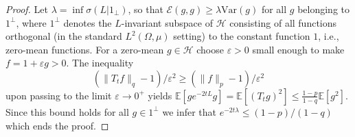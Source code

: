 \documentclass[11pt]{amsart}
\newcommand{\E}{\mathbb{E}}
\newcommand{\Var}{\mathrm{Var}}
\newcommand{\1}{\mathbf{1}}
\def\e{{\mathcal{E}}}
\def\E{{\mathbb E}}
\def\H{{\mathcal{H}}}
\theoremstyle{definition}
\theoremstyle{plain}
\theoremstyle{remark}
\numberwithin{equation}{section}
\begin{document}
\begin{proof}
Let $\lambda=\inf \sigma(L|1_{\perp})$, so that $\e(g, g) \ge \lambda \Var(g)$ for all $g$ belonging to
$1^{\perp}$,  where $1^{\perp}$ denotes the $L$-invariant subspace of $\H$ consisting of all functions
orthogonal (in the standard $L^{2}(\Omega, \mu)$ setting) to the constant function $1$, i.e.,  zero-mean functions.
For a zero-mean $g \in \H$ choose $\varepsilon>0$ small enough to make $f=1+\varepsilon g>0$. The inequality
\[
(\| T_{t}f\|_{q}-1)/\varepsilon^{2} \geq
(\| f\|_{p}-1)/\varepsilon^{2}
\]
upon passing to the limit $\varepsilon \to 0^{+}$ yields
$\E [ge^{-2tL}g]=\E[ (T_{t}g)^{2}] \leq \frac{1-p}{1-q} \E[g^{2}]$. Since this bound holds for all $g \in 1^{\perp}$ we infer that
$e^{-2t\lambda} \leq (1-p)/(1-q)$ which ends the proof.
\end{proof}
\end{document}
